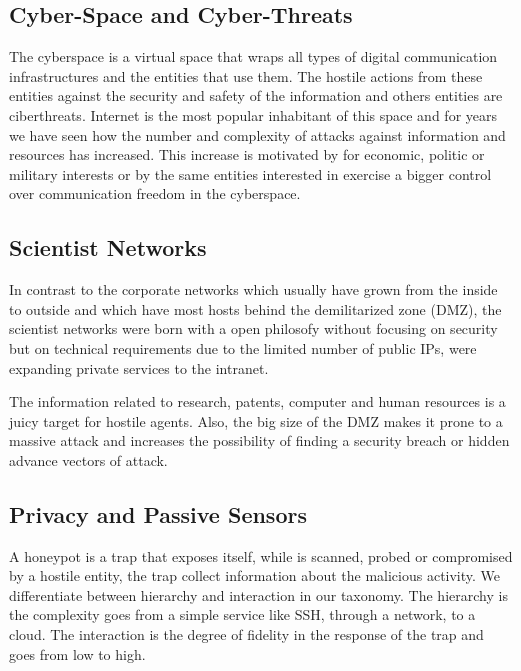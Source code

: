 \documentclass[a4paper]{llncs}
\begin{document}
\subsection{Cyber-Space and Cyber-Threats}
\label{sect:Scientist Networks}

The cyberspace is a virtual space that wraps all types of digital
communication  infrastructures and the entities that use them. The hostile actions from these entities against the security and safety of the information and others entities are ciberthreats. Internet is the most popular inhabitant of this space and for years we have seen how
the number and complexity of attacks against information and resources has increased. This increase is motivated by for economic, politic or military interests or by the same entities interested in exercise a bigger control over communication freedom in the cyberspace\cite{cni-ccn-tendencias-2014}\cite{cni-ccn-tendencias-2015}.
\subsection{Scientist Networks}
\label{sect:Scientist Networks}
In contrast to the corporate networks which usually have grown from
the inside to outside %
and which have most hosts behind the demilitarized
zone (DMZ), %
the scientist networks were born with a open philosofy without focusing on security but on technical requirements due to the limited number of public IPs, were expanding private services to the intranet.\cite{iris-proyecto}

The information related to research, patents, computer and human resources is a juicy target for hostile agents. Also, the big size of the DMZ %
 makes it prone to a massive attack and increases the possibility of finding a security breach or hidden advance vectors of attack.

\subsection{Privacy and Passive Sensors}
\label{sect:Privacy and Passive Sensors}
A honeypot is a trap that exposes itself, while is scanned, probed or compromised by a hostile entity, the trap collect information about the malicious activity. We differentiate between hierarchy and interaction in our taxonomy. The hierarchy is the complexity goes from a simple service like SSH, through a network, to a cloud. The interaction is the degree of fidelity in the response of the trap and goes from low to high.\\
\end{document}
